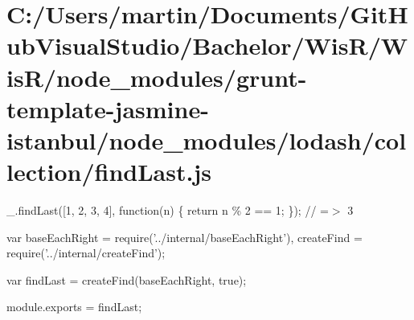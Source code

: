 \hypertarget{_c_1_2_users_2martin_2_documents_2_git_hub_visual_studio_2_bachelor_2_wis_r_2_wis_r_2node_moduleba18a0a76f82db5f4be386597c29a785}{}\section{C\+:/\+Users/martin/\+Documents/\+Git\+Hub\+Visual\+Studio/\+Bachelor/\+Wis\+R/\+Wis\+R/node\+\_\+modules/grunt-\/template-\/jasmine-\/istanbul/node\+\_\+modules/lodash/collection/find\+Last.\+js}
\+\_\+.\+find\+Last(\mbox{[}1, 2, 3, 4\mbox{]}, function(n) \{ return n \% 2 == 1; \}); // =$>$ 3


\begin{DoxyCodeInclude}
var baseEachRight = require(\textcolor{stringliteral}{'../internal/baseEachRight'}),
    createFind = require(\textcolor{stringliteral}{'../internal/createFind'});

var findLast = createFind(baseEachRight, \textcolor{keyword}{true});

module.exports = findLast;
\end{DoxyCodeInclude}
 